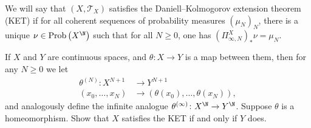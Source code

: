 \documentclass[10pt]{mypackage}
\begin{document}
We will say that $\left( X,\mathcal{T}_X \right)$ satisfies the Daniell--Kolmogorov extension theorem (KET) if for all coherent sequences of probability measures $\left( \mu_N \right)_N$, there is a unique $\nu\in \operatorname{Prob}\left( X^{\N} \right)$ such that for all $N\geq 0$, one has $\left( \Pi^{X}_{\infty,N} \right)_{\ast}\nu = \mu_N$.
\begin{problem}[Problem IV.1]
  If $X$ and $Y$ are continuous spaces, and $\theta\colon X\to Y$ is a map between them, then for any $N\geq 0$ we let
  \begin{align*}
    \theta^{(N)}\colon X^{N+1} &\to Y^{N+1}\\
    \left( x_0,\dots,x_N \right) &\to \left( \theta\left( x_0 \right),\dots,\theta\left( x_N \right) \right),
  \end{align*}
  and analogously define the infinite analogue $\theta^{(\infty)}\colon X^{\N}\to Y^{\N}$. Suppose $\theta$ is a homeomorphism. Show that $X$ satisfies the KET if and only if $Y$ does.
\end{problem}
\end{document}
